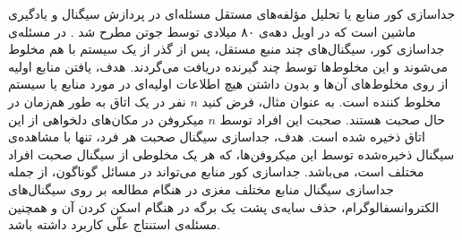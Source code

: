 

جداسازی کور منابع 
یا 
تحلیل مؤلفه‌های مستقل
مسئله‌ای  در پردازش سیگنال و یادگیری ماشین است که در اویل دهه‌ی ۸۰ میلادی توسط جوتن  مطرح شد
\cite{historicalnotes}. 
در مسئله‌ی جداسازی کور، سیگنال‌های چند منبع مستقل، پس از گذر از یک سیستم با هم مخلوط می‌شوند و این مخلوط‌ها توسط چند گیرنده دریافت می‌گردند. هدف، یافتن منابع اولیه از روی مخلوط‌های آن‌ها و بدون داشتن هیچ اطلاعات اولیه‌ای در مورد منابع یا سیستم مخلوط کننده است. به عنوان مثال،  فرض کنید $n$ نفر در یک اتاق به طور هم‌زمان در حال صحبت هستند.  صحبت این افراد توسط $n$ میکروفن در مکان‌های دلخواهی از این اتاق ذخیره شده است. هدف، جداسازی سیگنال صحبت هر فرد، تنها با مشاهده‌ی سیگنال ذخیره‌شده توسط این میکروفن‌ها، که هر یک مخلوطی از سیگنال صحبت افراد مختلف است، می‌باشد. جداسازی کور منابع می‌تواند در مسائل گوناگون، از جمله جداسازی سیگنال منابع مختلف مغزی در هنگام مطالعه بر روی سیگنال‌های الکتروانسفالوگرام، حذف سایه‌ی پشت یک برگه در هنگام اسکن کردن آن و همچنین مسئله‌ی استنتاج علّی کاربرد داشته باشد.


